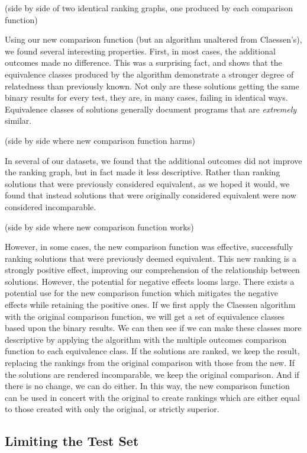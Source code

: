 \documentclass[11pt]{article}
\begin{document}
(side by side of two identical ranking graphs, one produced by each comparison function)

Using our new comparison function (but an algorithm unaltered from Claessen's), we found several interesting properties. First, in most cases, the additional outcomes made no difference. This was a surprising fact, and shows that the equivalence classes produced by the algorithm demonstrate a stronger degree of relatedness than previously known. Not only are these solutions getting the same binary results for every test, they are, in many cases, failing in  identical ways. Equivalence classes of solutions generally document programs that are \emph{extremely} similar.

(side by side where new comparison function harms)

In several of our datasets, we found that the additional outcomes did not improve the ranking graph, but in fact made it less descriptive. Rather than ranking solutions that were previously considered equivalent, as we hoped it would, we found that instead solutions that were originally considered equivalent were now considered incomparable.

(side by side where new comparison function works)

However, in some cases, the new comparison function was effective, successfully ranking solutions that were previously deemed equivalent. This new ranking is a strongly positive effect, improving our comprehension of the relationship between solutions. However, the potential for negative effects looms large. There exists a potential use for the new comparison function which mitigates the negative effects while retaining the positive ones. If we first apply the Claessen algorithm with the original comparison function, we will get a set of equivalence classes based upon the binary results. We can then see if we can make these classes more descriptive by applying the algorithm with the multiple outcomes comparison function to each equivalence class. If the solutions are ranked, we keep the result, replacing the rankings from the original comparison with those from the new. If the solutions are rendered incomparable, we keep the original comparison. And if there is no change, we can do either. In this way, the new comparison function can be used in concert with the original to create rankings which are either equal to those created with only the original, or strictly superior.

\subsection{Limiting the Test Set}
\end{document}
